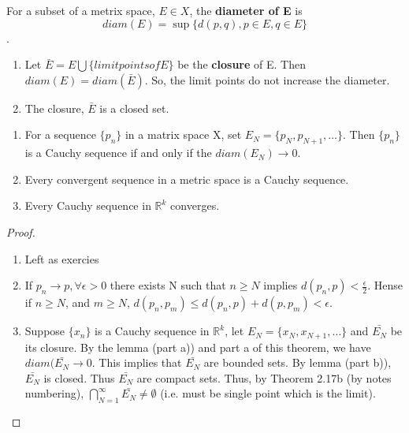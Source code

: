 \documentclass[11pt,fleqn]{book} %
\begin{document}
\begin{definition}
	For a subset of a metrix space, $E \in X$, the \textbf{diameter of E} is 
	$$diam(E) = \sup \{d(p,q), p \in E, q \in E \} $$.
\end{definition}

\begin{lemma}
	\begin{enumerate}[label = \alph*)]
		\item Let $\bar{E} = E \bigcup \{limit points of E\}$ be the \textbf{closure} of E. Then $diam(E) = diam(\bar{E})$. So, the limit points do not increase the diameter.
		\item The closure, $\bar{E}$ is a closed set.
	\end{enumerate}
\end{lemma}

\begin{theorem}
	\begin{enumerate}[label = \alph*)]
		\item For a sequence $\{p_n\}$ in a matrix space X, set  $E_N = \{p_N, p_{N+1}, \dots \}$. Then $\{p_n\}$ is a Cauchy sequence if and only if the $diam(E_N) \rightarrow 0$.
		\item Every convergent sequence in a metric space is a Cauchy sequence.
		\item Every Cauchy sequence in $\mathbb{R}^k$ converges.
	\end{enumerate}
\end{theorem}

\begin{proof}
	\begin{enumerate}[label = \alph*)]
		\item Left as exercies
		\item If $p_n \rightarrow p, \forall \epsilon > 0$ there exists N such that $n \ge N$ implies $d(p_n, p) <\frac{\epsilon}{2}$. Hense if $n\ge N$, and $m \ge N$, $d(p_n, p_m) \le d(p_n, p) + d(p, p_m) < \epsilon$.
		\item Suppose $\{x_n\}$ is a Cauchy sequence in $\mathbb{R}^k$, let $E_N = \{x_N, x_{N+1}, \dots \}$ and $\bar{E_N}$ be its closure. By the lemma (part a)) and part a of this theorem, we have $diam(\bar{E_N} \rightarrow 0$. This implies that $\bar{E_N}$ are bounded sets. By lemma (part b)), $\bar{E_N}$ is closed. Thus $\bar{E_N}$ are compact sets.
		Thus, by Theorem 2.17b (by notes numbering), $\bigcap\limits^\infty_{N=1} \bar{E_N} \neq \emptyset$ (i.e. must be single point which is the limit).
	\end{enumerate}

\end{proof}
\end{document}

